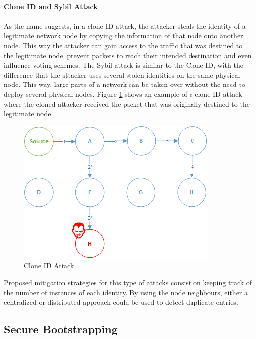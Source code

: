 \paragraph{\textbf{Clone ID and Sybil Attack}}
\paragraph{}
As the name suggests, in a clone ID attack, the attacker steals the identity of a legitimate network node by copying the information of that node onto another node. This way the attacker can gain access to the traffic that was destined to the legitimate node, prevent packets to reach their intended destination and even influence voting schemes. The Sybil attack is similar to the Clone ID, with the difference that the attacker uses several stolen identities on the same physical node. This way, large parts of a network can be taken over without the need to deploy several physical nodes. Figure \ref{fig:clone_attack} shows an example of a clone ID attack where the cloned attacker received the packet that was originally destined to the legitimate node.

\begin{figure}[h]
  \centering
  \includegraphics[width=0.8\linewidth]{figures/Clone_attack.png}
  \caption{Clone ID Attack}
  \label{fig:clone_attack}
\end{figure} 

Proposed mitigation strategies for this type of attacks consist on keeping track of the number of instances of each identity. By using the node neighbours, either a centralized or distributed approach could be used to detect duplicate entries.

\subsection{Secure Bootstrapping}
\label{sec:secure_bootstrapping}
